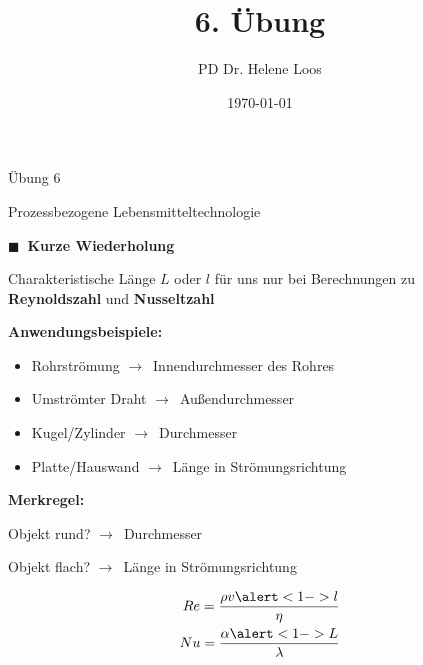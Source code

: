 \documentclass[aspectratio=169,9pt]{beamer}
\title{6. Übung}
\author{PD Dr. Helene Loos}
\date{\today}
\newcommand{\RA}{$\rightarrow$~}
\newcommand{\pp}{\par \vspace*{2mm}}
\newcommand{\ppbig}{\par \vspace*{4mm}}
\newcommand{\antwort}[1]{
\begin{tcolorbox}[
	enhanced,
	colframe=unigrau!65,
	sharp corners,
	boxsep=1pt,
	colback=white,
	coltitle=black,
]
	#1
	\end{tcolorbox}
}
\begin{document}
\small



\begin{frame}
\begin{center}

\LARGE Übung 6  \par \normalsize
Prozessbezogene Lebensmitteltechnologie
\end{center}
\small
\end{frame}









\begin{frame}

{\color{miugray}$\blacksquare ~$} \textbf{Kurze Wiederholung} \par \vspace*{2mm}
\pp
Charakteristische Länge $L$ oder $l$ für uns nur bei Berechnungen zu \textbf{Reynoldszahl} und \textbf{Nusseltzahl}
\ppbig

\begin{minipage}{.5\textwidth}

\textbf{Anwendungsbeispiele:}
\begin{itemize}
\item[$\cdot$] Rohrströmung \RA Innendurchmesser des Rohres
\item[$\cdot$] Umströmter Draht \RA Außendurchmesser
\item[$\cdot$] Kugel/Zylinder \RA Durchmesser
\item[$\cdot$] Platte/Hauswand \RA Länge in Strömungsrichtung
\end{itemize}
\end{minipage}%
\hspace*{4mm}
\begin{minipage}{.5\textwidth}

\antwort{

\textbf{Merkregel:} \pp 
Objekt rund? \RA Durchmesser \par 
Objekt flach? \RA Länge in Strömungsrichtung
}

\end{minipage}%
\pp
\begin{align*}
Re = \frac{\rho v \alert<1->{l}}{\eta} \\
Nu = \frac{\alpha \alert<1->{L}}{\lambda}
\end{align*}

\end{frame}
\end{document}
